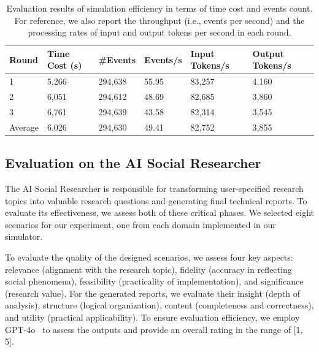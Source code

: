 \documentclass{article}
\theoremstyle{definition}
\theoremstyle{theorem}
\theoremstyle{proof}
\theoremstyle{remark}
\begin{document}
\begin{table}[t]
\centering
\caption{
Evaluation results of simulation efficiency in terms of time cost and events count. For reference, we also report the throughput (i.e., events per second) and the processing rates of input and output tokens per second in each round.
}
\renewcommand\arraystretch{1.3}
\label{tab:performance}
\begin{tabular}{m{1.3cm}<{\centering}|
m{2.0cm}<{\centering}|
m{1.8cm}<{\centering}|
m{1.5cm}<{\centering}|
m{2.2cm}<{\centering}|
m{2.5cm}<{\centering}}\hline\hline
    \textbf{Round} & \textbf{Time Cost (s)} & \textbf{\#Events} & \textbf{Events/s} & \textbf{Input Tokens/s} & \textbf{Output Tokens/s}  \\
    \hline
    1 & 5,266 & 294,638 & 55.95 & 83,257 & 4,160  \\
    2 & 6,051 & 294,612 & 48.69 & 82,685 & 3,860  \\
    3 & 6,761 & 294,639 & 43.58 & 82,314 & 3,545 \\
    \hline
    {Average} & 6,026 & 294,630 & 49.41 & 82,752 & 3,855 \\
    \hline\hline
\end{tabular}
\vspace{-0.5cm}\end{table}



    \subsection{Evaluation on the AI Social Researcher}
    The AI Social Researcher is responsible for transforming user-specified research topics into valuable research questions and generating final technical reports. To evaluate its effectiveness, we assess both of these critical phases. We selected eight scenarios for our experiment, one from each domain implemented in our simulator. 


    To evaluate the quality of the designed scenarios, 
    we assess four key aspects: relevance (alignment with the research topic), fidelity (accuracy in reflecting social phenomena), feasibility (practicality of implementation), and significance (research value).
    For the generated reports, we evaluate their insight (depth of analysis), structure (logical organization), content (completeness and correctness), and utility (practical applicability).
    To ensure evaluation efficiency, we employ GPT-4o~\cite{hurst2024gpt} to assess the outputs and provide an overall rating in the range of [1, 5].
    
\end{document}
